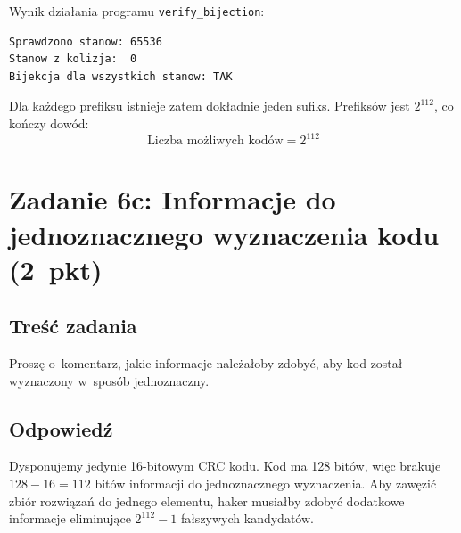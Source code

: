 \documentclass[12pt,a4paper]{article}
\begin{document}
\medskip
\noindent Wynik działania programu \texttt{verify\_bijection}:

\begin{lstlisting}[language={}, numbers=none, basicstyle=\ttfamily\small]
Sprawdzono stanow: 65536
Stanow z kolizja:  0
Bijekcja dla wszystkich stanow: TAK
\end{lstlisting}

Dla każdego prefiksu istnieje zatem dokładnie jeden sufiks.
Prefiksów jest $2^{112}$, co kończy dowód:
\[
  \boxed{\text{Liczba możliwych kodów} = 2^{112}}
\]

\section*{Zadanie 6c: Informacje do jednoznacznego wyznaczenia kodu (2~pkt)}

\subsection*{Treść zadania}

Proszę o~komentarz, jakie informacje należałoby zdobyć, aby kod został
wyznaczony w~sposób jednoznaczny.

\subsection*{Odpowiedź}

Dysponujemy jedynie 16-bitowym CRC kodu. Kod ma 128 bitów, więc brakuje
$128 - 16 = 112$ bitów informacji do jednoznacznego wyznaczenia.
Aby zawęzić zbiór rozwiązań do jednego elementu, haker musiałby zdobyć
dodatkowe informacje eliminujące $2^{112} - 1$ fałszywych kandydatów.
\end{document}

